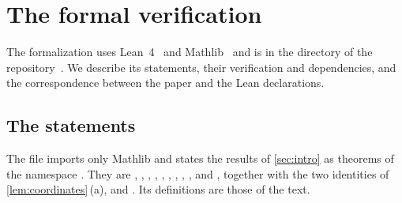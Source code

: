 \section{The formal verification}\label{app:formal}

The formalization uses Lean~4~\cite{Lean4} and Mathlib~\cite{Mathlib20} and is in the directory
 of the repository~\cite{Companion}. We describe its
statements, their verification and dependencies, and the correspondence between the paper and
the Lean declarations.

\subsection{The statements}\label{app:formal-statements}

{\sloppy
The file  imports only Mathlib and states the
results of \cref{sec:intro} as theorems of the namespace .
They are , , , ,
, , , ,
,  and , together with the two
identities of \cref{lem:coordinates}\,(a),  and . Its
definitions are those of the text.\par}
